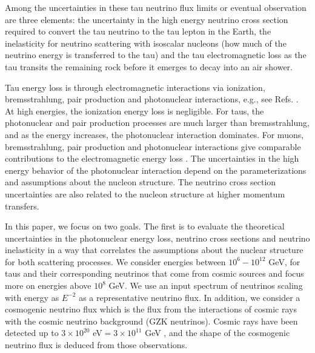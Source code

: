 \documentclass[aps,10pt,twocolumn,tightenlines]{revtex4-1}
\begin{document}
Among the uncertainties in these tau neutrino flux limits or 
eventual  observation are three elements: 
the uncertainty in the high energy neutrino cross section \cite{Gandhi:1998ri,Reno:2004cx,Jeong:2010za,Goncalves:2010ay,CooperSarkar:2011pa,Fiore:2011gx,Goncalves:2015fua,Albacete:2015zra,Arguelles:2015wba}
required to convert the tau neutrino
to the tau lepton in the Earth, the inelasticity for 
neutrino scattering with isoscalar nucleons (how much of the neutrino energy is transferred to the tau) and the 
tau electromagnetic loss \cite{Dutta:2000hh,Chirkin:2004hz,Dutta:2005yt,Armesto:2007tg,Bigas:2008ff,Koehne:2013gpa} as the
tau transits the remaining rock before it emerges to decay into an air shower. 

Tau energy loss is through electromagnetic interactions via ionization, bremsstrahlung, pair production and photonuclear interactions, e.g., see Refs. \cite{Dutta:2000hh,Chirkin:2004hz,Dutta:2005yt,Armesto:2007tg,Lipari:1991ut,Lohmann:1985qg,Antonioli:1997qw,Koehne:2013gpa,Bigas:2008ff,Sokalski:2000nb}.
At high energies, the ionization energy loss is negligible. For taus, the photonuclear  and pair production processes are much larger than bremsstrahlung, and
as the energy increases, the photonuclear interaction dominates. For muons, bremsstrahlung, pair production and photonuclear interactions give comparable contributions to the electromagnetic energy loss \cite{Lohmann:1985qg}. The uncertainties in the high energy behavior of the photonuclear interaction depend 
on the  parameterizations and assumptions about the nucleon structure. 
The neutrino cross section uncertainties are also related to the 
nucleon structure at higher momentum transfers. 

In this paper, we focus on two goals. The first is to evaluate the 
theoretical uncertainties in the photonuclear energy loss, neutrino cross sections and neutrino inelasticity in a way that correlates the assumptions about the nuclear structure for both scattering processes. We consider energies between $10^6-10^{12}$ GeV, for taus and their corresponding neutrinos that come from cosmic sources 
and focus more on energies above $10^8$ GeV. 
We use an input spectrum of neutrinos scaling with energy as $E^{-2}$ as a representative neutrino flux.  In addition, we consider a cosmogenic neutrino 
flux which is the flux from the interactions of cosmic rays with the 
cosmic neutrino background (GZK neutrinos).  Cosmic rays have been detected up to $ 3 \times 10^{20}$ eV$= 3 \times 10^{11}$ GeV \cite{Bird:1994wp}, 
and the shape of the cosmogenic neutrino flux is deduced from those 
observations.
 
\end{document}
